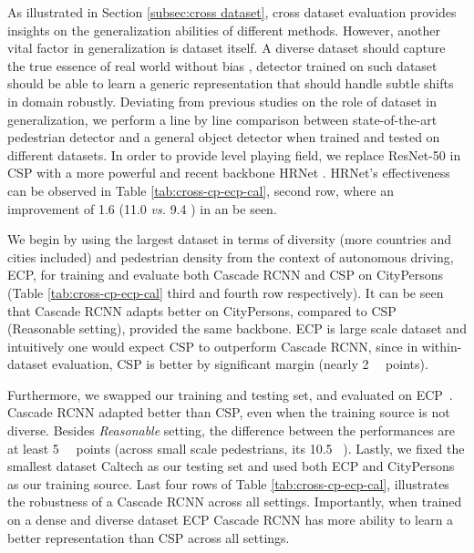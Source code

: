 \documentclass[final]{cvpr}
\newcommand{\LMR}[1]{{}}
\newcommand{\ecp}[1]{{ECP~\cite{braun2018eurocity}}}
\newcommand{\caltecha}[1]{{Caltech}}
\newcommand{\citypersona}[1]{{CityPersons}}
\newcommand{\ecpa}[1]{{ECP}}
\begin{document}
As illustrated in Section \ref{subsec:cross dataset}, cross dataset evaluation provides insights on the generalization abilities of different methods. However, another vital factor in generalization is dataset itself. A diverse dataset should capture the true essence of real world without bias \cite{braun2018eurocity}, detector trained on such dataset should be able to learn a generic representation that should handle subtle shifts in domain robustly. 
Deviating from previous studies \cite{braun2018eurocity,shao2018crowdhuman,zhang2019widerpersondataset} on the role of dataset in generalization, we perform a line by line comparison between state-of-the-art pedestrian detector and a general object detector when trained and tested on different datasets. In order to provide level playing field, we replace ResNet-50 in CSP \cite{Liu2018DBC} with a more powerful and recent backbone HRNet \cite{wang2019deep}. HRNet's effectiveness can be observed in Table \ref{tab:cross-cp-ecp-cal}, second row, where an improvement of 1.6 (11.0 \emph{vs.} 9.4 ) in \LMR can be seen. 




We begin by using the largest dataset in terms of diversity (more countries and cities included) and pedestrian density from the context of autonomous driving, \ecpa{}, for training and evaluate both Cascade RCNN and CSP on \citypersona{} (Table \ref{tab:cross-cp-ecp-cal} third and fourth row respectively). It can be seen that Cascade RCNN adapts better on \citypersona{}, compared to CSP (Reasonable setting), provided the same backbone. \ecpa{} is large scale dataset and intuitively one would expect CSP to outperform Cascade RCNN, since in within-dataset evaluation, CSP is better by significant margin (nearly 2 \LMR ~~points).

Furthermore, we swapped our training and testing set, and evaluated on \ecp{}. Cascade RCNN adapted better than CSP, even when the training source is not diverse. Besides \emph{Reasonable} setting, the difference between the performances are at least 5  \LMR ~~points (across small scale pedestrians,  its 10.5  \LMR~). Lastly, we fixed the smallest dataset \caltecha{} as our testing set and used both \ecpa{} and \citypersona{} as our training source. Last four rows of Table \ref{tab:cross-cp-ecp-cal}, illustrates the robustness of a Cascade RCNN across all settings. Importantly, when trained on a dense and diverse dataset \ecpa, Cascade RCNN has more ability to learn a better representation than CSP across all settings.
\end{document}

